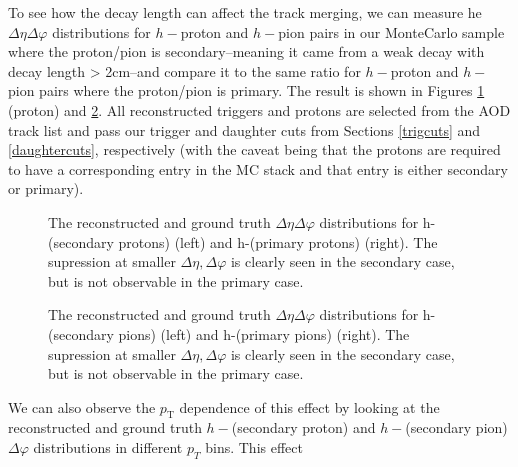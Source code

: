 \documentclass[ALICE,manyauthors]{ALICE_analysis_notes}
\begin{document}
To see how the decay length can affect the track merging, we can measure he $\Delta\eta\Delta\varphi$ distributions for $h-$proton and $h-$pion pairs in our MonteCarlo sample where the proton/pion is secondary--meaning it came from a weak decay with decay length > 2cm--and compare it to the same ratio for $h-$proton and $h-$pion pairs where the proton/pion is primary. The result is shown in Figures \ref{trackmerge_hproton} (proton) and \ref{trackmerge_hpion}. All reconstructed triggers and protons are selected from the AOD track list and pass our trigger and daughter cuts from Sections \ref{trigcuts} and \ref{daughtercuts}, respectively (with the caveat being that the protons are required to have a corresponding entry in the MC stack and that entry is either secondary or primary).

\begin{figure}[ht]
\centering
\begin{subfigure}{
\texttt{[image: figures/track\_merging\_hproton\_secondary.pdf]}}
\end{subfigure}
\begin{subfigure}{
\texttt{[image: figures/track\_merging\_hproton\_primary.pdf]}}
\end{subfigure}
\caption{The  reconstructed and ground truth $\Delta\eta\Delta\varphi$ distributions for h-(secondary protons) (left) and h-(primary protons) (right). The supression at smaller $\Delta\eta, \Delta\varphi$ is clearly seen in the secondary case, but is not observable in the primary case.}
\label{trackmerge_hproton}
\end{figure}

\begin{figure}[ht]
\centering
\begin{subfigure}{
\texttt{[image: figures/track\_merging\_hpion\_secondary.pdf]}}
\end{subfigure}
\begin{subfigure}{
\texttt{[image: figures/track\_merging\_hpion\_primary.pdf]}}
\end{subfigure}
\caption{The  reconstructed and ground truth $\Delta\eta\Delta\varphi$ distributions for h-(secondary pions) (left) and h-(primary pions) (right). The supression at smaller $\Delta\eta, \Delta\varphi$ is clearly seen in the secondary case, but is not observable in the primary case.}
\label{trackmerge_hpion}
\end{figure}

We can also observe the $p_\text{T}$ dependence of this effect by looking at the reconstructed and ground truth $h-$(secondary proton) and $h-$(secondary pion) $\Delta\varphi$ distributions in different $p_{T}$ bins. This effect 
\end{document}
